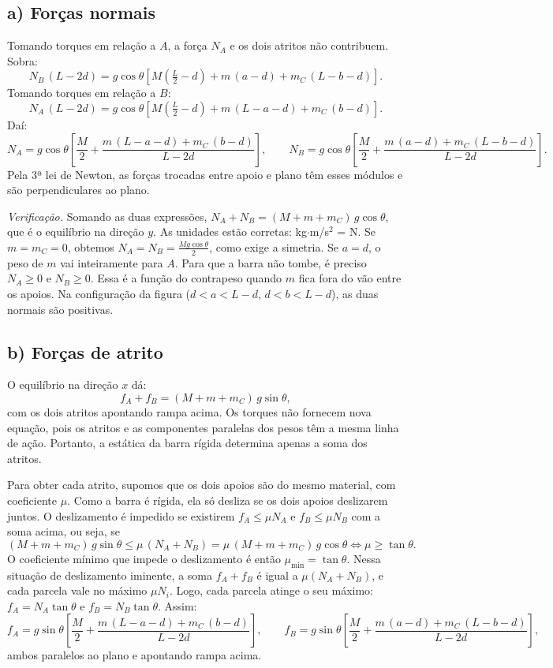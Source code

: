 \documentclass{article}%
\begin{document}
\subsection*{a) Forças normais}

Tomando torques em relação a $A$, a força $N_A$ e os dois atritos não contribuem. Sobra:
\[
N_B\,(L-2d)=g\cos\theta\left[M\left(\tfrac{L}{2}-d\right)+m\,(a-d)+m_C\,(L-b-d)\right].
\]
Tomando torques em relação a $B$:
\[
N_A\,(L-2d)=g\cos\theta\left[M\left(\tfrac{L}{2}-d\right)+m\,(L-a-d)+m_C\,(b-d)\right].
\]
Daí:
\[
\boxed{N_A=g\cos\theta\left[\frac{M}{2}+\frac{m\,(L-a-d)+m_C\,(b-d)}{L-2d}\right]},\qquad
\boxed{N_B=g\cos\theta\left[\frac{M}{2}+\frac{m\,(a-d)+m_C\,(L-b-d)}{L-2d}\right]}.
\]
Pela 3ª lei de Newton, as forças trocadas entre apoio e plano têm esses módulos e são perpendiculares ao plano.

\emph{Verificação.} Somando as duas expressões, $N_A+N_B=(M+m+m_C)\,g\cos\theta$, que é o equilíbrio na direção $y$. As unidades estão corretas: kg$\cdot$m/s$^2$ = N. Se $m=m_C=0$, obtemos $N_A=N_B=\tfrac{Mg\cos\theta}{2}$, como exige a simetria. Se $a=d$, o peso de $m$ vai inteiramente para $A$. Para que a barra não tombe, é preciso $N_A\ge 0$ e $N_B\ge 0$. Essa é a função do contrapeso quando $m$ fica fora do vão entre os apoios. Na configuração da figura ($d<a<L-d$, $d<b<L-d$), as duas normais são positivas.

\subsection*{b) Forças de atrito}

O equilíbrio na direção $x$ dá:
\[
f_A+f_B=(M+m+m_C)\,g\sin\theta ,
\]
com os dois atritos apontando rampa acima. Os torques não fornecem nova equação, pois os atritos e as componentes paralelas dos pesos têm a mesma linha de ação. Portanto, a estática da barra rígida determina apenas a soma dos atritos.

Para obter cada atrito, supomos que os dois apoios são do mesmo material, com coeficiente $\mu$. Como a barra é rígida, ela só desliza se os dois apoios deslizarem juntos. O deslizamento é impedido se existirem $f_A\le\mu N_A$ e $f_B\le\mu N_B$ com a soma acima, ou seja, se
\[
(M+m+m_C)\,g\sin\theta\le\mu\,(N_A+N_B)=\mu\,(M+m+m_C)\,g\cos\theta\iff\mu\ge\tan\theta .
\]
O coeficiente mínimo que impede o deslizamento é então $\mu_{\min}=\tan\theta$. Nessa situação de deslizamento iminente, a soma $f_A+f_B$ é igual a $\mu(N_A+N_B)$, e cada parcela vale no máximo $\mu N_i$. Logo, cada parcela atinge o seu máximo: $f_A=N_A\tan\theta$ e $f_B=N_B\tan\theta$. Assim:
\[
\boxed{f_A=g\sin\theta\left[\frac{M}{2}+\frac{m\,(L-a-d)+m_C\,(b-d)}{L-2d}\right]},\qquad
\boxed{f_B=g\sin\theta\left[\frac{M}{2}+\frac{m\,(a-d)+m_C\,(L-b-d)}{L-2d}\right]},
\]
ambos paralelos ao plano e apontando rampa acima.
\end{document}
